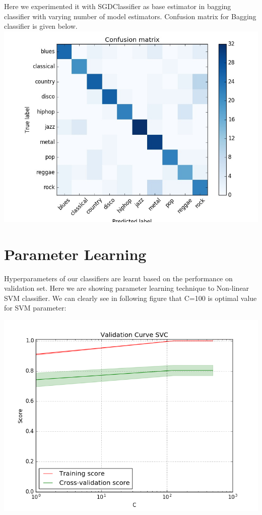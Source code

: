 \documentclass[conference]{IEEEtran}
\begin{document}
Here we experimented it with SGDClassifier as base estimator in bagging classifier with varying number of model estimators.
Confusion matrix for Bagging classifier is given below.
\includegraphics[width=\columnwidth]{BAGGING}

\section{Parameter Learning}
\label{sec:Results}

Hyperparameters of our classifiers are learnt based on the performance on validation set. Here we are showing parameter learning technique to Non-linear SVM classifier. We can clearly see in following figure that C=100 is optimal value for SVM parameter:

\includegraphics[width=\columnwidth]{validation}
\end{document}
